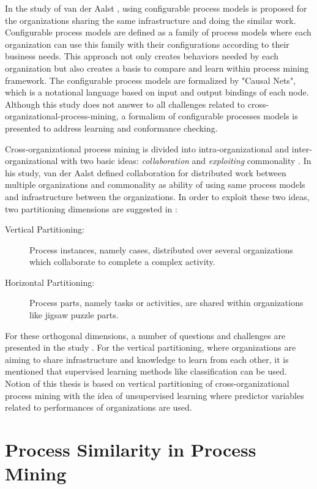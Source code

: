In the study of van der Aalst \cite{van2011business}, using configurable process models is proposed for the organizations sharing the same infrastructure and doing the similar work. Configurable process models are defined as a family of process models where each organization can use this family with their configurations according to their business needs. This approach not only creates behaviors needed by each organization but also creates a basis to compare and learn within process mining framework. The configurable process models are formalized by "Causal Nets", which is a notational language based on input and output bindings of each node. Although this study does not answer to all challenges related to cross-organizational-process-mining, a formalism of configurable processes models is presented to address learning and conformance checking.

Cross-organizational process mining is divided into intra-organizational and inter-organizational with two basic ideas: \textit{collaboration} and \textit{exploiting} commonality \cite{van2011intra}. In his study, van der Aalst defined collaboration for distributed work between multiple organizations and commonality as ability of using same process models and infrastructure between the organizations. In order to exploit these two ideas, two partitioning dimensions are suggested in \cite{van2011intra}:

\begin{description}
	\item[Vertical Partitioning:] Process instances, namely cases, distributed over several organizations which collaborate to complete a complex activity. 
	\item[Horizontal Partitioning:] Process parts, namely tasks or activities, are shared within organizations like jigsaw puzzle parts.
\end{description}

For these orthogonal dimensions, a number of questions and challenges are presented in the study  \cite{van2011intra}. For the vertical partitioning, where organizations are aiming to share infrastructure and knowledge to learn from each other, it is mentioned that supervised learning methods like classification can be used. Notion of this thesis is based on vertical partitioning of cross-organizational process mining with the idea of unsupervised learning where predictor variables related to performances of organizations are used.
 
\section{Process Similarity in Process Mining}
\label{sec:process-similarity-in-process-mining}


